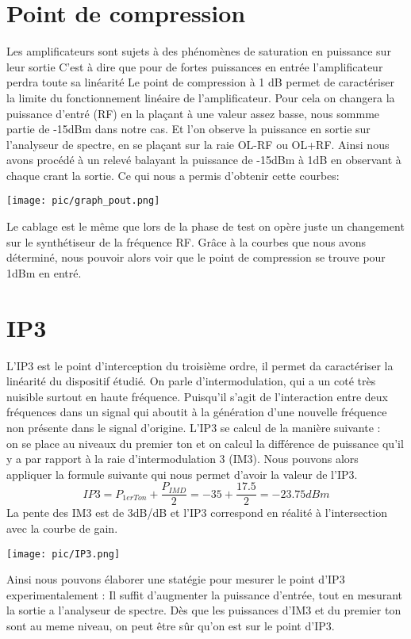 \documentclass[a4paper,12pt]{report}            %
\begin{document}
\section{Point de compression}
Les amplificateurs sont sujets à des phénomènes de saturation en puissance sur leur sortie
C'est à dire que pour de fortes puissances en entrée l'amplificateur perdra toute sa linéarité
Le point de compression à 1 dB permet de caractériser la limite du fonctionnement linéaire de l'amplificateur. 
Pour cela on changera la puissance d'entré (RF) en la plaçant à une valeur assez basse, nous sommme partie de 
-15dBm dans notre cas. Et l'on observe la puissance en sortie sur l'analyseur de spectre, en se plaçant sur la raie OL-RF ou OL+RF.
Ainsi nous avons procédé à un relevé balayant la puissance de -15dBm à 1dB en observant à chaque crant la sortie.
Ce qui nous a permis d'obtenir cette courbes:
\begin{center}\texttt{[image: pic/graph\_pout.png]}\\ \end{center}
Le cablage est le même que lors de la phase de test on opère juste un changement sur le synthétiseur de la fréquence RF.
Grâce à la courbes que nous avons déterminé, nous pouvoir alors voir que le point de compression se trouve pour 1dBm en entré.
\section{IP3}
L'IP3 est le point d'interception du troisième ordre, il permet da caractériser la linéarité du dispositif étudié.
On parle d'intermodulation, qui a un coté très nuisible surtout en haute fréquence. Puisqu'il s’agit de l’interaction entre 
deux fréquences dans un signal qui aboutit à la génération d’une nouvelle fréquence non 
présente dans le signal d’origine.
L'IP3 se calcul de la manière suivante : \\
on se place au niveaux du premier ton et on calcul la différence de puissance qu'il y a par rapport à la raie d'intermodulation 3 (IM3).
Nous pouvons alors appliquer la formule suivante qui nous permet d'avoir la valeur de l'IP3.
$$ IP3 = P_{1erTon} + \frac{P_{IMD}}{2} = -35 + \frac{17.5}{2} = -23.75 dBm $$
La pente des IM3 est de 3dB/dB et l'IP3 correspond en réalité à l'intersection avec la courbe de gain.
\begin{center}\texttt{[image: pic/IP3.png]}\\ \end{center}
    Ainsi nous pouvons élaborer une statégie pour mesurer le point d'IP3 experimentalement :
Il suffit d'augmenter la puissance d'entrée, tout en mesurant la sortie a l'analyseur de spectre.
Dès que les puissances d'IM3 et du premier ton sont au meme niveau, on peut être sûr qu'on est sur le point d'IP3.
\end{document}
